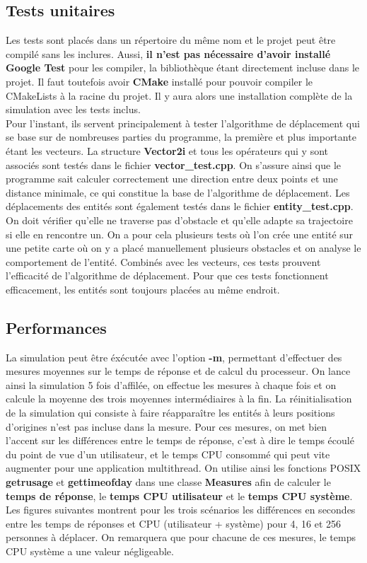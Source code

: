 \documentclass[11pt]{article} %
\begin{document}
\subsection{Tests unitaires}
Les tests sont placés dans un répertoire du même nom et le projet peut être compilé sans les inclures. Aussi, \textbf{il n'est pas nécessaire d'avoir installé Google Test} pour les compiler, la bibliothèque étant directement incluse dans le projet. Il faut toutefois avoir \textbf{CMake} installé pour pouvoir compiler le CMakeLists à la racine du projet. Il y aura alors une installation complète de la simulation avec les tests inclus. \\

Pour l'instant, ils servent principalement à tester l'algorithme de déplacement qui se base sur de nombreuses parties du programme, la première et plus importante étant les vecteurs. La structure \textbf{Vector2i} et tous les opérateurs qui y sont associés sont testés dans le fichier \textbf{vector\_test.cpp}. On s'assure ainsi que le programme sait calculer correctement une direction entre deux points et une distance minimale, ce qui constitue la base de l'algorithme de déplacement. 
Les déplacements des entités sont également testés dans le fichier \textbf{entity\_test.cpp}. On doit vérifier qu'elle ne traverse pas d'obstacle et qu'elle adapte sa trajectoire si elle en rencontre un. On a pour cela plusieurs tests où l'on crée une entité sur une petite carte où on y a placé manuellement plusieurs obstacles et on analyse le comportement de l'entité. Combinés avec les vecteurs, ces tests prouvent l'efficacité de l'algorithme de déplacement. Pour que ces tests fonctionnent efficacement, les entités sont toujours placées au même endroit.

\subsection{Performances}
La simulation peut être éxécutée avec l'option \textbf{-m}, permettant d'effectuer des mesures moyennes sur le temps de réponse et de calcul du processeur. On lance ainsi la simulation 5 fois d'affilée, on effectue les mesures à chaque fois et on calcule la moyenne des trois moyennes intermédiaires à la fin. La réinitialisation de la simulation qui consiste à faire réapparaître les entités à leurs positions d'origines n'est pas incluse dans la mesure. Pour ces mesures, on met bien l'accent sur les différences entre le temps de réponse, c'est à dire le temps écoulé du point de vue d'un utilisateur, et le temps CPU consommé qui peut vite augmenter pour une application multithread. On utilise ainsi les fonctions POSIX \textbf{getrusage} et \textbf{gettimeofday} dans une classe \textbf{Measures} afin de calculer le \textbf{temps de réponse}, le \textbf{temps CPU utilisateur} et le \textbf{temps CPU système}. Les figures suivantes montrent pour les trois scénarios les différences en secondes entre les temps de réponses et CPU (utilisateur + système) pour 4, 16 et 256 personnes à déplacer.
On remarquera que pour chacune de ces mesures, le temps CPU système a une valeur négligeable.
\end{document}
